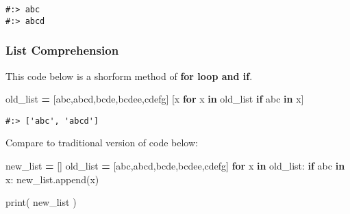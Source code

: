 \documentclass[
]{book}
\newenvironment{Shaded}{\begin{snugshade}}{\end{snugshade}}
\newcommand{\BuiltInTok}[1]{#1}
\newcommand{\ControlFlowTok}[1]{\textcolor[rgb]{0.27,0.27,0.27}{\textbf{#1}}}
\newcommand{\KeywordTok}[1]{\textcolor[rgb]{0.27,0.27,0.27}{\textbf{#1}}}
\newcommand{\NormalTok}[1]{#1}
\newcommand{\OperatorTok}[1]{\textcolor[rgb]{0.43,0.43,0.43}{\textbf{#1}}}
\newcommand{\StringTok}[1]{\textcolor[rgb]{0.5,0.5,0.5}{#1}}
\begin{document}
\begin{verbatim}
#:> abc
#:> abcd
\end{verbatim}

\hypertarget{list-comprehension}{%
\subsubsection{List Comprehension}\label{list-comprehension}}

This code below is a shorform method of \textbf{for loop and if}.

\begin{Shaded}
\begin{Highlighting}[]
\NormalTok{old\_list }\OperatorTok{=}\NormalTok{ [}\StringTok{\textquotesingle{}abc\textquotesingle{}}\NormalTok{,}\StringTok{\textquotesingle{}abcd\textquotesingle{}}\NormalTok{,}\StringTok{\textquotesingle{}bcde\textquotesingle{}}\NormalTok{,}\StringTok{\textquotesingle{}bcdee\textquotesingle{}}\NormalTok{,}\StringTok{\textquotesingle{}cdefg\textquotesingle{}}\NormalTok{]}
\NormalTok{[x }\ControlFlowTok{for}\NormalTok{ x }\KeywordTok{in}\NormalTok{ old\_list }\ControlFlowTok{if} \StringTok{\textquotesingle{}abc\textquotesingle{}} \KeywordTok{in}\NormalTok{ x]}
\end{Highlighting}
\end{Shaded}

\begin{verbatim}
#:> ['abc', 'abcd']
\end{verbatim}

Compare to traditional version of code below:

\begin{Shaded}
\begin{Highlighting}[]
\NormalTok{new\_list }\OperatorTok{=}\NormalTok{ []}
\NormalTok{old\_list }\OperatorTok{=}\NormalTok{ [}\StringTok{\textquotesingle{}abc\textquotesingle{}}\NormalTok{,}\StringTok{\textquotesingle{}abcd\textquotesingle{}}\NormalTok{,}\StringTok{\textquotesingle{}bcde\textquotesingle{}}\NormalTok{,}\StringTok{\textquotesingle{}bcdee\textquotesingle{}}\NormalTok{,}\StringTok{\textquotesingle{}cdefg\textquotesingle{}}\NormalTok{]}
\ControlFlowTok{for}\NormalTok{ x }\KeywordTok{in}\NormalTok{ old\_list:}
    \ControlFlowTok{if} \StringTok{\textquotesingle{}abc\textquotesingle{}} \KeywordTok{in}\NormalTok{ x:}
\NormalTok{        new\_list.append(x)}
        
\BuiltInTok{print}\NormalTok{( new\_list )}
\end{Highlighting}
\end{Shaded}
\end{document}
